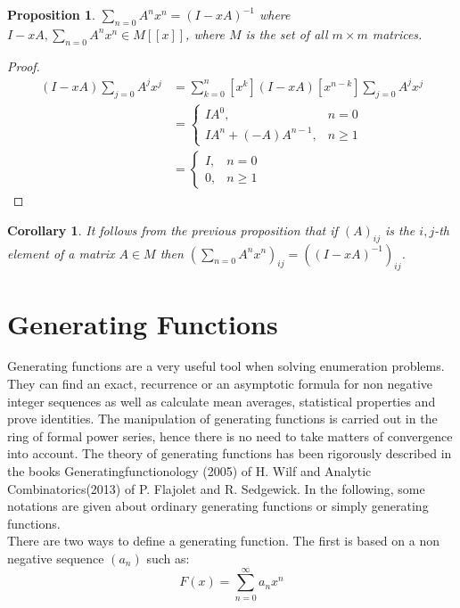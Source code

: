 \documentclass[12pt]{report}
\newtheorem{prop}{Proposition}
\newtheorem{cor}{Corollary}
\begin{document}
{\begin{prop}
$\sum\limits_{n=0} A^n x^n = (I-xA)^{-1}$ where $I-xA, \sum\limits_{n=0} A^n x^n \in M[[x]]$, where $M$ is the set of all $m \times m$ matrices.
\end{prop}

\begin{proof}
\begin{align*}
[x^n](I-xA) \sum\limits_{j=0} A^j x^j &= \sum\limits_{k=0}^n [x^k] (I-xA) [x^{n-k}] \sum\limits_{j=0} A^j x^j \\
&= \begin{cases} I A^0, & n=0 \\
I A^n + (-A) A^{n-1}, & n\geq 1 \end{cases} \\
&= \begin{cases} I, & n=0 \\
0, & n\geq 1 \end{cases}
\end{align*}
\end{proof}

\begin{cor}
It follows from the previous proposition that if $(A)_{ij}$ is the $i,j$-th element of a matrix $A \in M$ then $(\sum\limits_{n=0} A^n x^n)_{ij}=((I-xA)^{-1})_{ij}$.
\end{cor}


\section{Generating Functions}
Generating functions are a very useful tool when solving enumeration problems. They can find an exact, recurrence or an asymptotic formula for non negative integer sequences as well as calculate mean averages, statistical properties and prove identities. The manipulation of generating functions is carried out in the ring of formal power series, hence there is no need to take matters of convergence into account. The theory of generating functions has been rigorously described in the books Generatingfunctionology (2005) \cite{W2005} of H. Wilf and Analytic Combinatorics(2013)\cite{FS2013} of P. Flajolet and R. Sedgewick. In the following, some notations are given about ordinary generating functions or simply generating functions.\\


\noindent There are two ways to define a generating function. The first is based on a non negative sequence $(a_n)$ such as:
\[F(x)=\sum\limits_{n=0}^\infty a_n x^n\]

}
\end{document}
